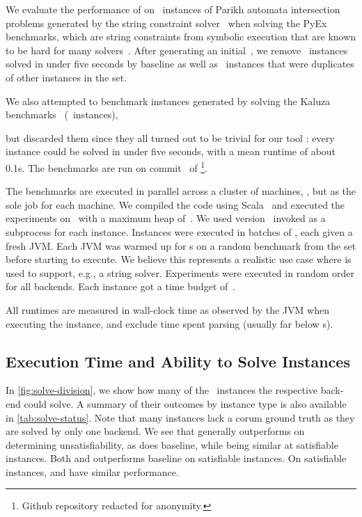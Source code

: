 
We evaluate the performance of \Catra{} on~\NrBenchmarks{} instances of Parikh
automata intersection problems generated by the \OstrichPlus{} string constraint
solver~\cite{ostrich-plus} when solving the PyEx benchmarks, 
which are string constraints from symbolic execution that are known
to be hard for many solvers~\cite{pyex}. After generating an
initial~\InitialNrBenchmarks{}, we remove~\NrTrivial{} instances solved in under
five seconds by baseline as well as~\NrInvalid{} instances that were duplicates of other instances in the set.

 We also attempted to benchmark instances generated by
\OstrichPlus{} solving the Kaluza benchmarks~\cite{Saxena10:kaluza}
(~instances),
\iffalse
and pyex-len
(\numprint{791}~instances) benchmark suites\fi
but discarded them since they all turned out to be trivial for our tool
\Catra{}: every instance
could be solved in under five seconds, with a mean runtime of about 0.1s.
The benchmarks are run
on commit~\texttt{\commit} of \Catra{}\footnote{Github repository redacted for anonymity.}.

The benchmarks are executed in parallel across a cluster of 
machines, \BenchmarkRig{}, but as the sole job for each machine.  We compiled
the code using Scala~\ScalaVersion{} and executed the experiments
on~\JvmVersion{} with a maximum heap of~\MaxHeapSize{}. We used \Nuxmv{}
version~\NuxmvVersion{} invoked as a subprocess for each instance. Instances
were executed in batches of \BatchSize{}, each given a fresh JVM. Each JVM was
warmed up for s on a random benchmark from the set before starting
to execute. We believe this represents a realistic use case where \Calculus{} is
used to support, e.g., a string solver. Experiments were executed in random order
for all backends. Each instance got a time budget of~\RuntimeTimeout.

All runtimes are measured in wall-clock time as observed by the JVM when
executing the instance, and exclude time spent parsing (usually far below
s).

\subsection{Execution Time and Ability to Solve Instances}\label{sec:runtime}

In \cref{fig:solve-division}, we show how many of the~\NrBenchmarks{} instances
the respective back-end could solve. A summary of their outcomes by instance
type is also available in \cref{tab:solve-status}. Note that many instances lack
a corum ground truth as they are solved by only one backend. We see that
\Calculus{} generally outperforms \Nuxmv{} on determining unsatisfiability, as
does baseline, while being similar at satisfiable instances. Both \Calculus{} and
\Nuxmv outperforms baseline on satisfiable instances. On satisfiable
instances, \Nuxmv and \Calculus{} have similar performance.


